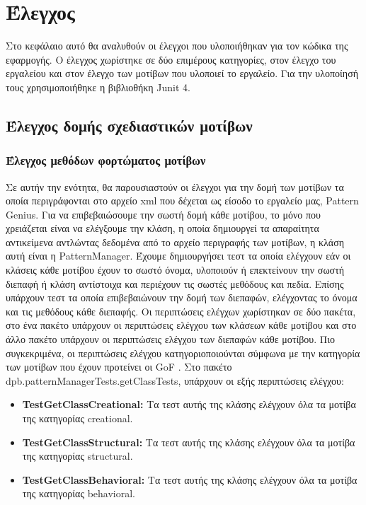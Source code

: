 \chapter{Έλεγχος}
\label{ch:testing}
Στο κεφάλαιο αυτό θα αναλυθούν οι έλεγχοι που υλοποιήθηκαν για τον κώδικα της εφαρμογής. 
Ο έλεγχος χωρίστηκε σε δύο επιμέρους κατηγορίες, στον έλεγχο του εργαλείου και στον έλεγχο των μοτίβων που υλοποιεί το εργαλείο.
Για την υλοποίησή τους χρησιμοποιήθηκε η βιβλιοθήκη Junit 4.
\section{Έλεγχος δομής σχεδιαστικών μοτίβων}
\label{sec:patternTesting}
\subsection{Έλεγχος μεθόδων φορτώματος μοτίβων}
\label{subsec:patternManagerTesting}
Σε αυτήν την ενότητα, θα παρουσιαστούν οι έλεγχοι για την δομή των μοτίβων τα οποία περιγράφονται στο αρχείο xml που δέχεται ως είσοδο 
το εργαλείο μας, Pattern Genius.
Για να επιβεβαιώσουμε την σωστή δομή κάθε μοτίβου, το μόνο που χρειάζεται είναι να ελέγξουμε την κλάση, η οποία δημιουργεί 
τα απαραίτητα αντικείμενα αντλώντας δεδομένα από το αρχείο περιγραφής των μοτίβων, η κλάση αυτή είναι η PatternManager.
Έχουμε δημιουργήσει τεστ τα οποία ελέγχουν εάν οι κλάσεις κάθε μοτίβου έχουν το σωστό όνομα, υλοποιούν ή επεκτείνουν την σωστή 
διεπαφή ή κλάση αντίστοιχα και περιέχουν τις σωστές μεθόδους και πεδία. Επίσης υπάρχουν τεστ τα οποία επιβεβαιώνουν την δομή των 
διεπαφών, ελέγχοντας το όνομα και τις μεθόδους κάθε διεπαφής. Οι περιπτώσεις ελέγχων χωρίστηκαν σε δύο πακέτα, 
στο ένα πακέτο υπάρχουν οι περιπτώσεις ελέγχου των κλάσεων κάθε μοτίβου και στο άλλο πακέτο υπάρχουν οι περιπτώσεις ελέγχου 
των διεπαφών κάθε μοτίβου. Πιο συγκεκριμένα, οι περιπτώσεις ελέγχου κατηγοριοποιούνται σύμφωνα με την 
κατηγορία των μοτίβων που έχουν προτείνει οι GoF \cite{GoF}. Στο πακέτο dpb.patternManagerTests.getClassTests, 
υπάρχουν οι εξής περιπτώσεις ελέγχου:
\begin{itemize}
    \item \textbf{TestGetClassCreational:} Τα τεστ αυτής της κλάσης ελέγχουν όλα τα μοτίβα της κατηγορίας creational.
    \item \textbf{TestGetClassStructural:} Τα τεστ αυτής της κλάσης ελέγχουν όλα τα μοτίβα της κατηγορίας structural.
    \item \textbf{TestGetClassBehavioral:} Τα τεστ αυτής της κλάσης ελέγχουν όλα τα μοτίβα της κατηγορίας behavioral.
\end{itemize}
